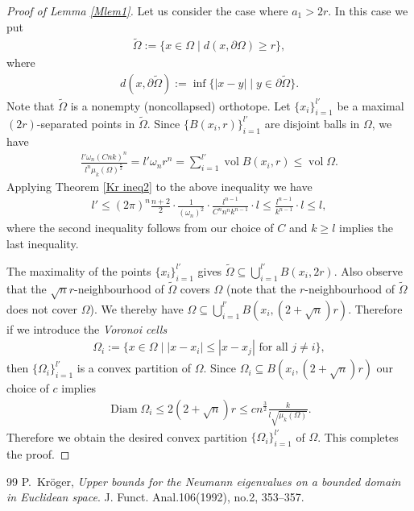 \documentclass[10pt,a4paper]{amsart}
\newcommand{\diam}{\operatorname{Diam}}
\newcommand{\vol}{\operatorname{vol}}
\begin{document}
\begin{proof}[Proof of Lemma \ref{Mlem1}]
    Let us consider the case where $a_1>2r$. In this case we put 
    \begin{align*}
        \widetilde{\Omega}:=\{x\in \Omega \mid d(x,\partial \Omega)\geq r\},
    \end{align*}where 
    \begin{align*}
        d(x,\partial \widetilde{\Omega}):=\inf \{|x-y| \mid y\in \partial \widetilde{\Omega}\}.
    \end{align*}
    Note that $\widetilde{\Omega}$ is a nonempty (noncollapsed) orthotope. Let $\{x_i\}_{i=1}^{l'}$ be a maximal $(2r)$-separated points in $\widetilde{\Omega}$. Since $\{B(x_i,r)\}_{i=1}^{l'}$ are disjoint balls in $\Omega$, we have
    \begin{align*}
       \frac{l'\omega_n(Cnk)^n}{l^n\mu_k(\Omega)^{\frac{n}{2}}}= l'\omega_n r^n =\sum_{i=1}^{l'} \vol B(x_i,r)\leq \vol \Omega.
    \end{align*}
    Applying Theorem \ref{Kr ineq2} to the above inequality we have
    \begin{align*}
        l'\leq (2\pi)^n\frac{n+2}{2}\cdot \frac{1}{(\omega_n)^2}\cdot \frac{l^{n-1}}{C^n n^nk^{n-1}}\cdot l\leq \frac{l^{n-1}}{k^{n-1}}\cdot l \leq l,
    \end{align*}where the second inequality follows from our choice of $C$ and $k\geq l$ implies the last inequality. 
   

    The maximality of the points $\{x_i\}_{i=1}^{l'}$ gives $\widetilde{\Omega}\subseteq \bigcup_{i=1}^{l'}B(x_i,2r)$. Also observe that the $\sqrt{n}r$-neighbourhood of $\widetilde{\Omega}$ covers $\Omega$ (note that the $r$-neighbourhood of $\widetilde{\Omega}$ does not cover $\Omega$). We thereby have $\Omega\subseteq \bigcup_{i=1}^{l'}B(x_i,(2+\sqrt{n})r)$. Therefore if we introduce the \emph{Voronoi cells}
    \begin{align*}
        \Omega_i:=\{x\in \Omega \mid |x-x_i|\leq |x-x_j| \text{ for all }j\neq i\},
    \end{align*}then $\{\Omega_i\}_{i=1}^{l'}$ is a convex partition of $\Omega$. Since $\Omega_i\subseteq B(x_i,(2+\sqrt{n})r)$ our choice of $c$ implies
    \begin{align*}
        \diam \Omega_i\leq 2(2+\sqrt{n})r\leq c n^{\frac{3}{2}}\frac{k}{l\sqrt{\mu_k(\Omega)}}.
    \end{align*}Therefore we obtain the desired convex partition $\{\Omega_i\}_{i=1}^{l'}$ of $\Omega$. This completes the proof.
\end{proof}

\begin{thebibliography}{99}
 P.~Kr\"{o}ger, \textit{Upper bounds for the Neumann eigenvalues on a bounded domain in Euclidean space}. J. Funct. Anal.106(1992), no.2, 353--357. %
\end{thebibliography}
\end{document}
